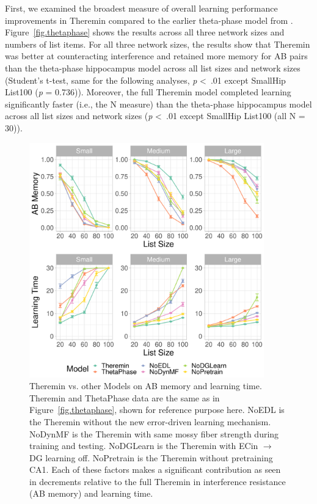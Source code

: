 \documentclass[11pt,twoside]{article}
\newif\myifpdf
\begin{document}
First, we examined the broadest measure of overall learning performance improvements in Theremin compared to the earlier theta-phase model from \citet{KetzMorkondaOReilly13}.  Figure~\ref{fig.thetaphase} shows the results across all three network sizes and numbers of list items.  For all three network sizes, the results show that Theremin was better at counteracting interference and retained more memory for AB pairs than the theta-phase hippocampus model across all list sizes and network sizes (Student's t-test, same for the following analyses, \emph{p} \textless \ .01 except SmallHip List100 (\emph{p} = 0.736)). Moreover, the full Theremin model completed learning significantly faster (i.e., the N measure) than the theta-phase hippocampus model across all list sizes and network sizes (\emph{p} \textless \ .01 except SmallHip List100 (all N = 30)).

\begin{figure}
  \centering\includegraphics[width=4in]{fig_hip_edl_mods}
  \caption{\footnotesize Theremin vs. other Models on AB memory and learning time.  Theremin and ThetaPhase data are the same as in Figure~\ref{fig.thetaphase}, shown for reference purpose here.  NoEDL is the Theremin without the new error-driven learning mechanism. NoDynMF is the Theremin with same mossy fiber strength during training and testing. NoDGLearn is the Theremin with ECin $\rightarrow$ DG learning off. NoPretrain is the Theremin without pretraining CA1. Each of these factors makes a significant contribution as seen in decrements relative to the full Theremin in interference resistance (AB memory) and learning time.}
\label{fig.mods}
\end{figure}
\end{document}
